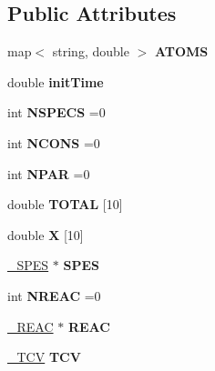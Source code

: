 \subsection*{Public Attributes}
\begin{DoxyCompactItemize}
\item 
\mbox{\label{classUModel_af29c7839f0a1d115eb7a8570bf44da4c}} 
map$<$ string, double $>$ {\bfseries A\+T\+O\+MS}
\item 
\mbox{\label{classUModel_a634653365e3d4ce42e637291aa940b30}} 
double {\bfseries init\+Time}
\item 
\mbox{\label{classUModel_ac07083e5e31a16452b7d76f1086ad4e1}} 
int {\bfseries N\+S\+P\+E\+CS} =0
\item 
\mbox{\label{classUModel_ab896ea61c59b3b4175803d168a4fd298}} 
int {\bfseries N\+C\+O\+NS} =0
\item 
\mbox{\label{classUModel_a687563585d29e83b3ada8a0c51e8f33c}} 
int {\bfseries N\+P\+AR} =0
\item 
\mbox{\label{classUModel_abdd816110011f5bc8f80ea16864a61c1}} 
double {\bfseries T\+O\+T\+AL} \mbox{[}10\mbox{]}
\item 
\mbox{\label{classUModel_af37c95b04367ee27da655a3e9a186745}} 
double {\bfseries X} \mbox{[}10\mbox{]}
\item 
\mbox{\label{classUModel_a1ddeacc4a750d349b34797dd54e9728c}} 
\hyperlink{structUModel_1_1__SPES}{\+\_\+\+S\+P\+ES} $\ast$ {\bfseries S\+P\+ES}
\item 
\mbox{\label{classUModel_a161074ae250acbae3a8b2bd55c94a949}} 
int {\bfseries N\+R\+E\+AC} =0
\item 
\mbox{\label{classUModel_afc6da453556a01a5685cb7c2b7318cf9}} 
\hyperlink{structUModel_1_1__REAC}{\+\_\+\+R\+E\+AC} $\ast$ {\bfseries R\+E\+AC}
\item 
\mbox{\label{classUModel_a78f91781f5c783ecdfeedfd3106c7c3a}} 
\hyperlink{structUModel_1_1__TCV}{\+\_\+\+T\+CV} {\bfseries T\+CV}

\end{DoxyCompactItemize}
